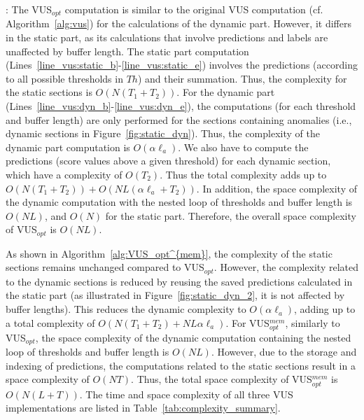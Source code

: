 : The VUS$_{opt}$ computation is similar to the original VUS computation (cf. Algorithm~\ref{alg:vus}) for the calculations of the dynamic part. 
However, it differs in the static part, as its calculations that involve predictions and labels are unaffected by buffer length. 
The static part computation (Lines~\ref{line_vus:static_b}-\ref{line_vus:static_e}) involves the predictions (according to all possible thresholds in $Th$) and their summation. 
Thus, the complexity for the static sections is $O(N(T_1+T_2))$. 
For the dynamic part (Lines~\ref{line_vus:dyn_b}-\ref{line_vus:dyn_e}), the computations (for each threshold and buffer length) are only performed for the sections containing anomalies (i.e., dynamic sections in Figure~\ref{fig:static_dyn}). Thus, the complexity of the dynamic part computation is $O(\alpha \ell_a)$.
We also have to compute the predictions (score values above a given threshold) for each dynamic section, which have a complexity of $O(T_2)$. 
Thus the total complexity adds up to $O(N(T_1+T_2))+O(NL(\alpha \ell_a+T_2))$.
In addition, the space complexity of the dynamic computation with the nested loop of thresholds and buffer length is $O(NL)$, and $O(N)$ for the static part. Therefore, the overall space complexity of VUS$_{opt}$ is $O(NL)$.

As shown in Algorithm~\ref{alg:VUS_opt^{mem}}, the complexity of the static sections remains unchanged compared to VUS$_{opt}$. However, the complexity related to the dynamic sections is reduced by reusing the saved predictions calculated in the static part (as illustrated in Figure~\ref{fig:static_dyn_2}, it is not affected by buffer lengths).
This reduces the dynamic complexity to  $O(\alpha \ell_a)$, adding up to a total complexity of $O(N(T_1+T_2)+ NL\alpha \ell_a)$. 
For VUS$_{opt}^{mem}$, similarly to VUS$_{opt}$, the space complexity of the dynamic computation containing the nested loop of thresholds and buffer length is $O(NL)$. However, due to the storage and indexing of predictions, the computations related to the static sections result in a space complexity of $O(NT)$. Thus, the total space complexity of VUS$_{opt}^{mem}$ is $O(N(L+T))$. 
The time and space complexity of all three VUS implementations are listed in Table~\ref{tab:complexity_summary}.

\begin{table}[tb]
    \centering
    \caption{{Space and time complexity of VUS implementations}}
    \label{tab:complexity_summary}
\end{table}


